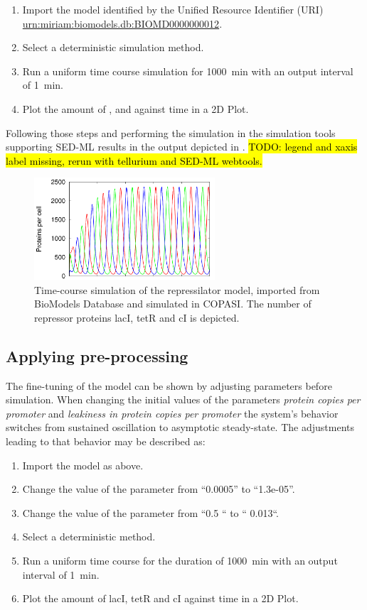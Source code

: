 \begin{enumerate}
 	\item{Import the model identified by the Unified Resource Identifier (URI) \citep{Berners-Lee:2005}\\ 	\url{urn:miriam:biomodels.db:BIOMD0000000012}.}
 	\item {Select a deterministic simulation method.}
 	\item{Run a uniform time course simulation for 1000~min with an output interval of 1~min.}
 	\item{Plot the amount of ,  and  against time in a 2D Plot.}
 \end{enumerate}

Following those steps and performing the simulation in the simulation tools supporting SED-ML results in the output depicted in . \hl{TODO: legend and xaxis label missing, rerun with tellurium and SED-ML webtools.}

\begin{figure}
\centering
\includegraphics[width=0.6\textwidth]{examples/rep_tc.png}
\caption{Time-course simulation of the repressilator model, imported from BioModels Database and simulated in COPASI. The number of repressor proteins lacI, tetR and cI is depicted.}
\label{fig:rep_tc}
\end{figure}


\subsection{Applying pre-processing}
\label{sec:preprocessing}
The fine-tuning of the model can be shown by adjusting parameters before simulation. When changing the initial values of the parameters \emph{protein copies per promoter} and \emph{leakiness in protein copies per promoter} the system's behavior switches from sustained oscillation to asymptotic steady-state. The adjustments leading to that behavior may be described as: 

\begin{enumerate}
\item{Import the model as above.}
\item{Change the value of the parameter  from “0.0005” to “1.3e-05”.}
\item{Change the value of the parameter  from “0.5 “ to “ 0.013“.}
\item{Select a deterministic method.}
\item{Run a uniform time course for the duration of 1000~min with an output interval of 1~min.}
\item Plot the amount of lacI, tetR and cI against time in a 2D Plot.
\end{enumerate}

